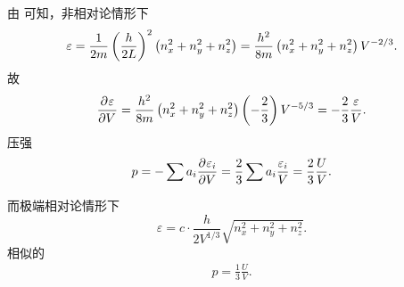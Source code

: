 由 可知，非相对论情形下
\[
	\varepsilon=\frac1{2m}\left(\frac h{2L}\right)^2\left(n_x^2+n_y^2+n_z^2\right)=\frac{h^2}{8m}\left(n_x^2+n_y^2+n_z^2\right)V^{-2/3}.
\]
故
\[
	\frac{\partial^{{}}\varepsilon}{\partial{V}^{{}}}=\frac{h^2}{8m}\left(n_x^2+n_y^2+n_z^2\right)\left(-\frac23\right)V^{-5/3}=-\frac23\frac\varepsilon V.
\]
压强
\begin{align}
	p=-\sum a_i\frac{\partial^{{}}\varepsilon_i}{\partial{V}^{{}}}=\frac23\sum a_i\frac{\varepsilon_i}V=\frac23\frac UV.
\end{align}

而极端相对论情形下
\[
	\varepsilon=c\cdot\frac h{2V^{1/3}}\sqrt{n_x^2+n_y^2+n_z^2}.
\]
相似的
\begin{align}
	p=\frac13\frac UV.
\end{align}